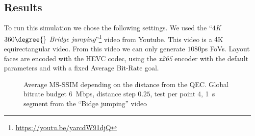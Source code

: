 


\subsection{Results}
\label{subsec:results}

To run this simulation we chose the following settings. We used the
``\textit{$4$K $360\degree{}$ Bridge
jumping}''\footnote{\url{https://youtu.be/yarcdW91djQ}} video from
Youtube. This video is a $4$K equirectangular video. From this video
we can only generate $1080$\acp{p} \acp{FoV}. Layout faces are encoded
with the \ac{HEVC} codec, using the \textit{x265} encoder with the
default parameters and with a fixed Average Bit-Rate goal.

\begin{figure}
    
    \caption{Average \acs{MS-SSIM} depending on the distance from the
    \acs{QEC}. Global bitrate budget \SI{6}{\mega bps}, distance step
    $0.25$, test per point $4$, \SI{1}{\second} segment from the ``Bidge jumping'' video}
    \label{fig:dist_quality}
\end{figure}

